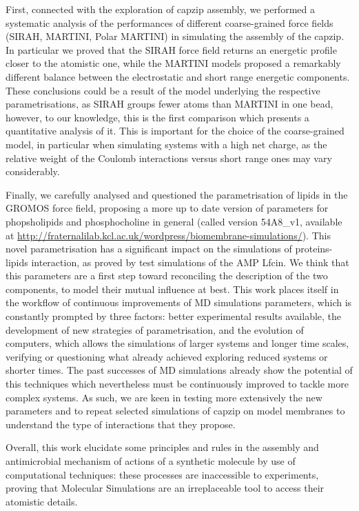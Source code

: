 First, connected with the exploration of capzip assembly, we performed a systematic analysis of the performances of different coarse-grained force fields (SIRAH, MARTINI, Polar MARTINI) in simulating the assembly of the capzip. In particular we proved that the SIRAH force field returns an energetic profile closer to the atomistic one, while the MARTINI models proposed a remarkably different balance between the electrostatic and short range energetic components. These conclusions could be a result of the model underlying the respective parametrisations, as SIRAH groups fewer atoms than MARTINI in one bead, however, to our knowledge, this is the first comparison which presents a quantitative analysis of it.
%
This is important for the choice of the coarse-grained model, in particular when simulating systems with a high net charge, as the relative weight of the Coulomb interactions versus short range ones may vary considerably.

Finally, we carefully analysed and questioned the parametrisation of lipids in the GROMOS force field, proposing a more up to date version of parameters for phopsholipids and phosphocholine in general (called version 54A8\_v1, available at \url{http://fraternalilab.kcl.ac.uk/wordpress/biomembrane-simulations/}). This novel parametrisation has a significant impact on the simulations of proteins-lipids interaction, as proved by test simulations of the AMP Lfcin. We think that this parameters are a first step toward reconciling the description of the two components, to model their mutual influence at best.
%
This work places itself in the workflow of continuous improvements of MD simulations parameters, which is constantly prompted by three factors: better experimental results available, the development of new strategies of parametrisation, and the evolution of computers, which allows the simulations of larger systems and longer time scales, verifying or questioning what already achieved exploring reduced systems or shorter times.
%
The past successes of MD simulations already show the potential of this techniques which nevertheless must be continuously improved to tackle more complex systems.
As such, we are keen in testing more extensively the new parameters and to repeat selected simulations of capzip on model membranes to understand the type of interactions that they propose.

Overall, this work elucidate some principles and rules in the assembly and antimicrobial mechanism of actions of a synthetic molecule by use of computational techniques: these processes are inaccessible to experiments, proving that Molecular Simulations are an irreplaceable tool to access their atomistic details.

